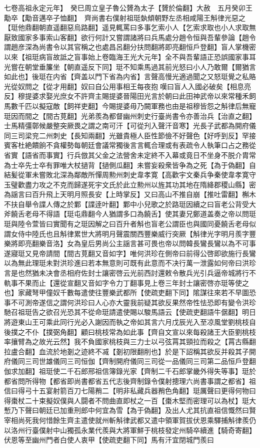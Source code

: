 七卷高祖永定元年】　癸巳周立皇子魯公贇為太子【贇於倫翻】大赦　五月癸卯王勱卒【勱音邁卒子恤翻】　齊尚書右僕射祖珽埶傾朝野左丞相咸陽王斛律光惡之【珽他鼎翻朝直遥翻惡烏路翻】遥見輒罵曰多事乞索小人【乞索求取也小人求取無厭致國家多事索山客翻】欲行何計又嘗謂諸將曰兵馬處分趙令恒與吾輩參論【趙令謂趙彦深為尚書令以其官稱之也處昌呂翻分扶問翻將即亮翻恒戶登翻】盲人掌機密以來【祖珽病盲故詆之盲事始上卷臨海王光大元年】全不與吾輩語正恐誤國家事耳光嘗在朝堂垂簾坐【朝直遥反下同】珽不知乘馬過其前光怒曰小人乃敢爾【爾猶言如此也】後珽在内省【齊盖以門下省為内省】言聲高慢光適過聞之又怒珽覺之私賂光從奴問之【從才用翻】奴曰自公用事相王每夜抱嘆曰盲人入國必破矣【相息亮反】穆提婆求娶光庶女不許齊主賜提婆晉陽田光言於朝曰此田神武帝以來常種禾飼馬數千匹以擬寇敵【飼祥吏翻】今賜提婆毋乃闕軍務也由是祖穆皆怨之斛律后無寵珽因而間之【間古莧翻】光弟羨為都督幽州刺史行臺尚書令亦善治兵【治直之翻】士馬精彊鄣候嚴整突厥畏之謂之南可汗【可從刋入聲汗音寒】光長子武都為開府儀同三司梁兖二州刺史【長知兩翻】光雖貴極人臣性節儉不好聲色【好呼到反】罕接賓客杜絶饋餉不貪權勢每朝廷會議常獨後言言輒合理或有表疏令人執筆口占之務從省實【語省而事實】行兵倣其父金之法營舍未定終不入幕或竟日不坐身不脱介胄常為士卒先士卒有罪唯大杖撾背【撾側瓜翻】未嘗妄殺衆皆争為之死【為于偽翻】自結髪從軍未嘗敗北深為鄰敵所憚周勲州刺史韋孝寛【高歡宇文秦兵争秦使韋孝寛守玉璧歡盡力攻之不克而歸遂死宇文氏於此立勲州以旌其功其地在隋絳郡稷山縣】密為謡言曰百升飛上天明月照長安【上時掌反】又曰高山不推自崩【推吐雷翻】槲木不扶自舉令諜人傳之於鄴【諜逹叶翻】鄴中小兒歌之於路珽因續之曰盲老公背受大斧饒舌老母不得語【珽屯鼎翻今人猶謂多口為饒舌】使其妻兄鄭道盖奏之帝以問珽珽與陸令萱皆曰實聞有之珽因解之曰百升者斛也盲老公謂臣也與國同憂饒舌老母似謂女侍中陸氏也且斛律累世大將明月聲震關西豐樂威行突厥【斛律光字明月羨字豐樂將即亮翻樂音洛】女為皇后男尚公主謡言甚可畏也帝以問韓長鸞長鸞以為不可事遂寢珽又見帝請間【間古莧翻又音如字】唯何洪珍在側帝曰前得公啓即欲施行長鸞以為無此理珽未對洪珍進曰若本無意則可既有此意而不决行萬一泄露如何帝曰洪珍言是也然猶未决會丞相府佐封士讓密啓云光前西討還敕令散兵光引兵逼帝城將行不軌事不果而止【還從宣翻又音如字令力丁翻事見上卷三年封士讓密啓亦珽等使之也】家藏弩甲僮奴千數每遣使往豐樂武都所【使疏吏翻下同】隂謀往來若不早圖恐事不可測帝遂信之謂何洪珍曰人心亦大靈我前疑其欲反果然帝性怯恐即有變令洪珍馳召祖珽告之欲召光恐其不從命珽請遣使賜以駿馬語云【使疏吏翻語牛倨翻】明日將遊東山王可乘此同行光必入謝因而執之帝如其言六月戊辰光入至凉風堂劉桃枝自後撲之不仆【撲弼角翻】顧曰桃枝常為如此事【齊自文宣以來每殺諸王大臣劉桃枝率攘臂為之故光云然】我不負國家桃枝與三力士以弓弦罥其頸拉而殺之【罥古縣翻拉盧合翻】血流於地剗之迹終不㓕【剗初限翻削也】於是下詔稱其欲反并殺其子開府儀同三司世雄儀同三司恒伽【齊制開府儀同三司從一品儀同三司第二品恒戶登翻伽求加翻】祖珽使二千石郎邢祖信簿錄光家【齊制二千石郎掌畿外得失等事】珽於都省問所得物【都省即尚書都省五代志後齊制錄令僕射摠理六尚書事謂之都省】祖信曰得弓十五宴射箭百刀七陽矟二【明非私藏兵器矟色角翻】珽厲聲曰更得何物曰得棗杖二十束擬奴僕與人闘者不問曲直即杖之一百【棗木堅而密理可以為杖】珽大慙乃下聲曰朝廷已加重刑郎中何宜為雪【為于偽翻】及出人尤其抗直祖信慨然曰賢宰相尚死我何惜餘生齊主遣使就州斬斛律武都又遣中領軍賀拔伏恩乘驛捕斛律羨仍以洛州行臺僕射中山獨孤永業代羨與大將軍鮮于桃枝發定州騎卒續進【騎奇寄翻】伏恩等至幽州門者白使人衷甲【使疏吏翻下同】馬有汗宜閉城門羨曰